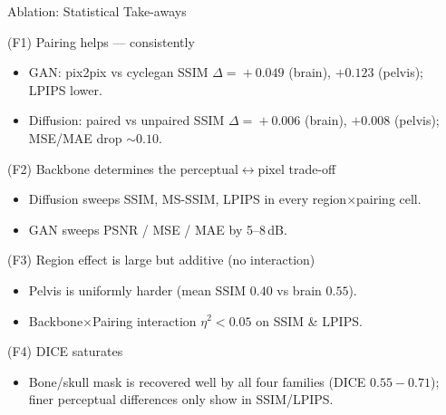 \documentclass[aspectratio=169,10pt]{beamer}
\begin{document}
\begin{frame}{Ablation: Statistical Take-aways}
\footnotesize
\begin{block}{(F1) Pairing helps --- consistently}
\begin{itemize}
    \item GAN: pix2pix vs cyclegan SSIM $\Delta\!=\!{+}0.049$ (brain), ${+}0.123$ (pelvis); LPIPS lower.
    \item Diffusion: paired vs unpaired SSIM $\Delta\!=\!{+}0.006$ (brain), ${+}0.008$ (pelvis); MSE/MAE drop ${\sim}0.10$.
\end{itemize}
\end{block}
\begin{block}{(F2) Backbone determines the perceptual$\leftrightarrow$pixel trade-off}
\begin{itemize}
    \item Diffusion sweeps SSIM, MS-SSIM, LPIPS in every region$\times$pairing cell.
    \item GAN sweeps PSNR / MSE / MAE by 5--8\,dB.
\end{itemize}
\end{block}
\begin{block}{(F3) Region effect is large but additive (no interaction)}
\begin{itemize}
    \item Pelvis is uniformly harder (mean SSIM $0.40$ vs brain $0.55$).
    \item Backbone$\times$Pairing interaction $\eta^2\!<\!0.05$ on SSIM \& LPIPS.
\end{itemize}
\end{block}
\begin{block}{(F4) DICE saturates}
\begin{itemize}
    \item Bone/skull mask is recovered well by all four families (DICE $0.55{-}0.71$); finer perceptual differences only show in SSIM/LPIPS.
\end{itemize}
\end{block}
\end{frame}


\end{document}
